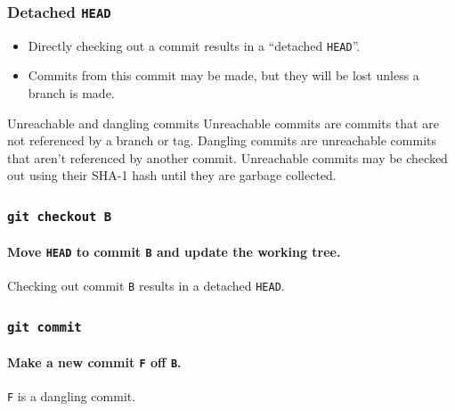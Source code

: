 \documentclass{beamer}
\newcommand\gitcmd[1]{\texttt{git #1}}
\newcommand\grefspec[1]{\texttt{#1}}
\newcommand\gHEAD{\texttt{HEAD}}
\begin{document}
\begin{frame}
  \frametitle{Detached \gHEAD{}}

  \begin{itemize}
    \item Directly checking out a commit results in a ``detached \gHEAD{}''.
    \item Commits from this commit may be made, but they will be lost unless a branch is made.
  \end{itemize}
  \vfill
  \begin{block}{Unreachable and dangling commits}
    Unreachable commits are commits that are not referenced by a branch or tag. Dangling commits are unreachable commits that aren't referenced by another commit. Unreachable commits may be checked out using their SHA-1 hash until they are garbage collected.
  \end{block}
\end{frame}

\begin{frame}
  \frametitle{\gitcmd{checkout B}}
  \framesubtitle{Move \gHEAD{} to commit \grefspec{B} and update the working tree.}
  \begin{figure}
    \centering
  \end{figure}

  Checking out commit \grefspec{B} results in a detached \gHEAD{}.
\end{frame}

\begin{frame}
  \frametitle{\gitcmd{commit}}
  \framesubtitle{Make a new commit \grefspec{F} off \grefspec{B}.}
  \begin{figure}
    \centering
  \end{figure}

  \grefspec{F} is a dangling commit.
\end{frame}
\end{document}
